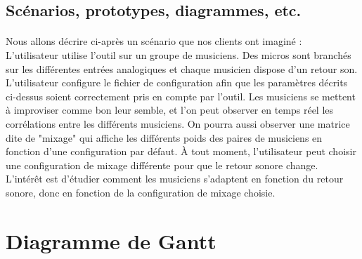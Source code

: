 \documentclass{article}
\begin{document}
    \subsection{Scénarios, prototypes, diagrammes, etc.}
      \paragraph{}
      Nous allons décrire ci-après un scénario que nos clients ont imaginé :\\
      L'utilisateur utilise l'outil sur un groupe de musiciens. Des micros sont
      branchés sur les différentes entrées analogiques et chaque musicien dispose
      d'un retour son. L'utilisateur configure le fichier de configuration afin
      que les paramètres décrits ci-dessus soient correctement pris en compte
      par l'outil. Les musiciens se mettent à improviser comme bon leur semble,
      et l'on peut observer en temps réel les corrélations entre les différents
      musiciens. On pourra aussi observer une matrice dite de "mixage" qui
      affiche les différents poids des paires de musiciens en fonction d'une
      configuration par défaut. À tout moment, l'utilisateur peut choisir une
      configuration de mixage différente pour que le retour sonore change.\\
      L'intérêt est d'étudier comment les musiciens s'adaptent en fonction du
      retour sonore, donc en fonction de la configuration de mixage choisie.
  \section{Diagramme de Gantt}
  
\end{document}
